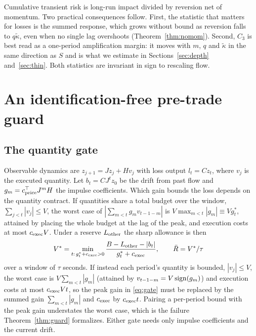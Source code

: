 Cumulative transient risk is long-run impact divided by reversion net of momentum. Two practical consequences follow. First, the statistic that matters for losses is the summed response, which grows without bound as reversion falls to $q\tilde\kappa$, even when no single lag overshoots (Theorem~\ref{thm:nomom}). Second, $C_3$ is best read as a one-period amplification margin: it moves with $m$, $q$ and $\tilde\kappa$ in the same direction as $S$ and is what we estimate in Sections~\ref{sec:depth} and~\ref{sec:thin}. Both statistics are invariant in sign to rescaling flow.

\section{An identification-free pre-trade guard}\label{sec:guard}

\subsection{The quantity gate}
Observable dynamics are $z_{j+1}=Jz_j+Hv_j$ with loss output $l_t=Cz_t$, where $v_j$ is the executed quantity. Let $b_t=CJ^tz_0$ be the drift from past flow and $g_m=c^\top_{\rm price}J^mH$ the impulse coefficients. Which gain bounds the loss depends on the quantity contract. If quantities share a total budget over the window, $\sum_{j<t}|v_j|\le V$, the worst case of $|\sum_{m<t}g_mv_{t-1-m}|$ is $V\max_{m<t}|g_m|\equiv Vg^*_t$, attained by placing the whole budget at the lag of the peak, and execution costs at most $c_{\rm exec}V$. Under a reserve $L_{\rm other}$ the sharp allowance is then
\begin{equation}\label{eq:gate}
V^*=\min_{t:\,g^*_t+c_{\rm exec}>0}\frac{B-L_{\rm other}-|b_t|}{g^*_t+c_{\rm exec}},\qquad\bar R=V^*/\tau
\end{equation}
over a window of $\tau$ seconds. If instead each period's quantity is bounded, $|v_j|\le V$, the worst case is $V\sum_{m<t}|g_m|$ (attained by $v_{t-1-m}=V\,{\rm sign}(g_m)$) and execution costs at most $c_{\rm exec}Vt$, so the peak gain in \eqref{eq:gate} must be replaced by the summed gain $\sum_{m<t}|g_m|$ and $c_{\rm exec}$ by $c_{\rm exec}t$. Pairing a per-period bound with the peak gain understates the worst case, which is the failure Theorem~\ref{thm:guard} formalizes. Either gate needs only impulse coefficients and the current drift.


